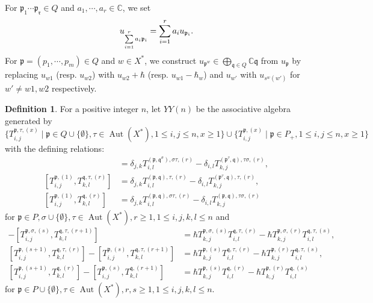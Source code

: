 \documentclass{article}
\theoremstyle{definition}
\newtheorem{Definition}[equation]{Definition}
\theoremstyle{remark}
\numberwithin{equation}{section}
\DeclareMathOperator{\Aut}{Aut}
\numberwithin{equation}{section}
\begin{document}
For $\mathfrak{p_1}\cdots\mathfrak{p_r}\in Q$ and $a_1,\cdots,a_r\in\mathbb{C}$, we set
\[
u_{\sum_{i=1}^r\limits a_i\mathfrak{p_i}}=\sum_{i=1}^r\limits a_iu_{\mathfrak{p_i}}.
\]
For $\mathfrak{p}=(p_1,\cdots,p_m)\in Q$ and $w\in X^*$, we construct $u_{\mathfrak{p}^w}\in\bigoplus_{\mathfrak{q}\in Q}\mathbb{C}\mathfrak{q}$ from $u_{\mathfrak{p}}$ by replacing $u_{w1}$ (resp. $u_{w2}$) with $u_{w2}+\hbar$ (resp. $u_{w1}-\hbar_w$) and $u_{w'}$ with $u_{s^w(w')}$ for $w'\neq w1,w2$ respectively. 
\begin{Definition}
For a positive integer $n$, let $YY(n)$ be the associative algebra generated by
\[
\{T^{\mathfrak{p},\tau,(x)}_{i,j}\mid \mathfrak{p}\in Q\cup\{\emptyset\},\tau\in\Aut(X^*),1\leq i,j\leq n,x\geq1\}\cup\{T^{\mathfrak{p},(x)}_{i,j}\mid \mathfrak{p}\in P_+,1\leq i,j\leq n,x\geq1\}
\]
with the defining relations:
\begin{align}
[T^{\mathfrak{p},\sigma,(1)}_{i,j},T^{\mathfrak{q},\tau,(r)}_{k,l}]&=\delta_{j,k}T^{(\mathfrak{p},\mathfrak{q}^\sigma),\sigma\tau,(r)}_{i,l}-\delta_{i,l}T^{(\mathfrak{p}^\tau,\mathfrak{q}),\tau\sigma,(r)}_{k,j},\label{gat1}\\
[T^{\mathfrak{p},(1)}_{i,j},T^{\mathfrak{q},\tau,(r)}_{k,l}]&=\delta_{j,k}T^{(\mathfrak{p},\mathfrak{q}),\tau,(r)}_{i,l}-\delta_{i,l}T^{(\mathfrak{p}^\tau,\mathfrak{q}),\tau,(r)}_{k,j},\label{gat2}\\
[T^{\mathfrak{p},(1)}_{i,j},T^{\mathfrak{q},(r)}_{k,l}]&=\delta_{j,k}T^{(\mathfrak{p},\mathfrak{q}),\sigma\tau,(r)}_{i,l}-\delta_{i,l}T^{(\mathfrak{p},\mathfrak{q}),\tau\sigma,(r)}_{k,j}\label{gat3}
\end{align}
for $\mathfrak{p}\in P,\sigma\cup\{\emptyset\},\tau\in\Aut(X^*),r\geq1,1\leq i,j,k,l\leq n$ and
\begin{align}
[T^{\mathfrak{p},\sigma,(s+1)}_{i,j},T^{\mathfrak{q},\tau,(r)}_{k,l}]-[T^{\mathfrak{p},\sigma,(s)}_{i,j},T^{\mathfrak{q},\tau,(r+1)}_{k,l}]
&=\hbar T^{\mathfrak{p},\sigma,(s)}_{k,j}T^{\mathfrak{q},\tau,(r)}_{i,l}-\hbar T^{\mathfrak{p},\sigma,(r)}_{k,j}T^{\mathfrak{q},\tau,(s)}_{i,l},\label{gat4}\\
[T^{\mathfrak{p},(s+1)}_{i,j},T^{\mathfrak{q},\tau,(r)}_{k,l}]-[T^{\mathfrak{p},(s)}_{i,j},T^{\mathfrak{q},\tau,(r+1)}_{k,l}]
&=\hbar T^{\mathfrak{p},(s)}_{k,j}T^{\mathfrak{q},\tau,(r)}_{i,l}-\hbar T^{\mathfrak{p},(r)}_{k,j}T^{\mathfrak{q},\tau,(s)}_{i,l},\label{gat5}\\
[T^{\mathfrak{p},(s+1)}_{i,j},T^{\mathfrak{q},(r)}_{k,l}]-[T^{\mathfrak{p},(s)}_{i,j},T^{\mathfrak{q},(r+1)}_{k,l}]
&=\hbar T^{\mathfrak{p},(s)}_{k,j}T^{\mathfrak{q},(r)}_{i,l}-\hbar T^{\mathfrak{p},(r)}_{k,j}T^{\mathfrak{q},(s)}_{i,l}\label{gat6}
\end{align}
for $\mathfrak{p}\in P\cup\{\emptyset\},\tau\in\Aut(X^*),r,s\geq1,1\leq i,j,k,l\leq n$.
\end{Definition}
\end{document}
